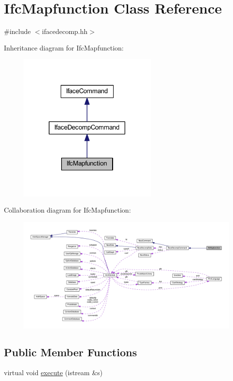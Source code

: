 \hypertarget{class_ifc_mapfunction}{}\section{Ifc\+Mapfunction Class Reference}
\label{class_ifc_mapfunction}


{\ttfamily \#include $<$ifacedecomp.\+hh$>$}



Inheritance diagram for Ifc\+Mapfunction\+:
\nopagebreak
\begin{figure}[H]
\begin{center}
\leavevmode
\includegraphics[width=197pt]{class_ifc_mapfunction__inherit__graph}
\end{center}
\end{figure}


Collaboration diagram for Ifc\+Mapfunction\+:
\nopagebreak
\begin{figure}[H]
\begin{center}
\leavevmode
\includegraphics[width=350pt]{class_ifc_mapfunction__coll__graph}
\end{center}
\end{figure}
\subsection*{Public Member Functions}
\begin{DoxyCompactItemize}
\item 
virtual void \mbox{\hyperlink{class_ifc_mapfunction_acf9d7edac75150821f0b9c6318e11dea}{execute}} (istream \&s)
\end{DoxyCompactItemize}
